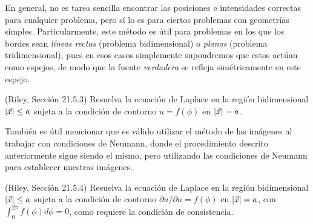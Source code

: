 En general, no es tarea sencilla encontrar las posiciones e intensidades correctas para cualquier problema, pero sí lo es para ciertos problemas con geometrías simples. Particularmente, este método es útil para problemas en los que los bordes sean \emph{líneas rectas} (problema bidimensional) o \emph{planos} (problema tridimensional), pues en esos casos simplemente supondremos que estos actúan como espejos, de modo que la fuente \emph{verdadera} se refleja simétricamente en este espejo.

\begin{ejemplo}
    (Riley, Sección 21.5.3) Resuelva la ecuación de Laplace en la región bidimensional $|\vec{x}| \leq a$ sujeta a la condición de contorno $u = f(\phi)$ en $|\vec{x}| = a$.
\end{ejemplo}

También es útil mencionar que es válido utilizar el método de las imágenes al trabajar con condiciones de Neumann, donde el procedimiento descrito anteriormente sigue siendo el mismo, pero utilizando las condiciones de Neumann para establecer nuestras imágenes.

\begin{ejemplo}
    (Riley, Sección 21.5.4) Resuelva la ecuación de Laplace en la región bidimensional $|\vec{x}| \leq a$ sujeta a la condición de contorno $\partial u/\partial n = f(\phi)$ en $|\vec{x}| = a$, con $\int_0^{2\pi} f(\phi) d\phi = 0$, como requiere la condición de consistencia.
\end{ejemplo}

